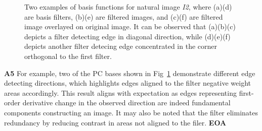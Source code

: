 \documentclass[11pt, twocolumn]{article}
\begin{document}
\begin{figure}[ht]
    \centering
    
    \caption{Two examples of basis functions for natural image \textit{I2}, where (a)(d) are basis filters, (b)(e) are filtered images, and (c)(f) are filtered image overlayed on original image. It can be observed that (a)(b)(c) depicts a filter detecting edge in diagonal direction, while (d)(e)(f) depicts another filter detecing edge concentrated in the corner orthogonal to the first filter.}
    \label{fig:5}
\end{figure}

\textbf{A5} For example, two of the PC bases shown in Fig~\ref{fig:5} demonstrate different edge detecting directions, which highlights edges aligned to the filter negative weight areas accordingly. 
This result aligns with expectation as edges representing first-order derivative change in the observed direction are indeed fundamental components constructing an image. It may also be noted that the filter eliminates redundancy by reducing contrast in areas not aligned to the filer. \textbf{EOA}
\end{document}
